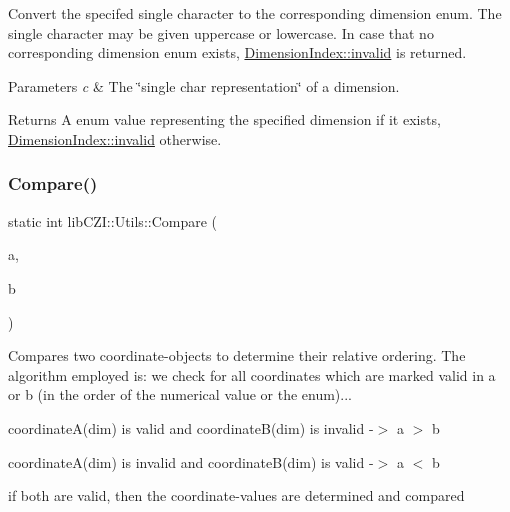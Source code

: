 Convert the specifed single character to the corresponding dimension enum. The single character may be given uppercase or lowercase. In case that no corresponding dimension enum exists, {\ttfamily \hyperlink{namespacelib_c_z_i_a55049658acf59d0eddfaebcad16df424afedb2d84cafe20862cb4399751a8a7e3}{Dimension\+Index\+::invalid}} is returned.


\begin{DoxyParams}{Parameters}
{\em c} & The \char`\"{}single char representation\char`\"{} of a dimension.\\
\hline
\end{DoxyParams}
\begin{DoxyReturn}{Returns}
A enum value representing the specified dimension if it exists, {\ttfamily \hyperlink{namespacelib_c_z_i_a55049658acf59d0eddfaebcad16df424afedb2d84cafe20862cb4399751a8a7e3}{Dimension\+Index\+::invalid}} otherwise. 
\end{DoxyReturn}
\mbox{\label{classlib_c_z_i_1_1_utils_a22bcbac6bcfb783d6dd3fbdb7c3b4f5f}} 
\subsubsection{\texorpdfstring{Compare()}{Compare()}}
{\footnotesize\ttfamily static int lib\+C\+Z\+I\+::\+Utils\+::\+Compare (\begin{DoxyParamCaption}\item[{const \hyperlink{classlib_c_z_i_1_1_i_dim_coordinate}{I\+Dim\+Coordinate} $\ast$}]{a,  }\item[{const \hyperlink{classlib_c_z_i_1_1_i_dim_coordinate}{I\+Dim\+Coordinate} $\ast$}]{b }\end{DoxyParamCaption})\hspace{0.3cm}{\ttfamily [static]}}

Compares two coordinate-\/objects to determine their relative ordering. The algorithm employed is\+: we check for all coordinates which are marked valid in a or b (in the order of the numerical value or the enum)...
\begin{DoxyEnumerate}
\item coordinate\+A(dim) is valid and coordinate\+B(dim) is invalid -\/$>$ a $>$ b
\item coordinate\+A(dim) is invalid and coordinate\+B(dim) is valid -\/$>$ a $<$ b
\item if both are valid, then the coordinate-\/values are determined and compared
\end{DoxyEnumerate}


